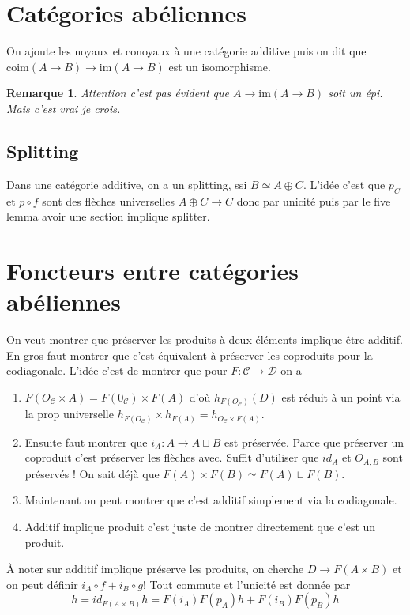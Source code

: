 \documentclass[a4paper,12pt]{book}
\newcommand{\Cat}{\mathcal{C}}
\newcommand{\Dat}{\mathcal{D}}
\newcommand{\im}{\textrm{im}}
\newcommand{\coim}{\textrm{coim}}
\theoremstyle{plain}
\newtheorem{rem}{Remarque}
\theoremstyle{definition}
\theoremstyle{remark}
\begin{document}
\section{Catégories abéliennes}
On ajoute les noyaux et conoyaux à une catégorie additive puis
on dit que $\coim(A\to B)\to \im(A\to B)$ est un isomorphisme.
\begin{rem}
  Attention c'est pas évident que $A\to \im(A\to B)$ soit un
  épi. Mais c'est vrai je crois.
\end{rem}

\subsection{Splitting}
Dans une catégorie additive, on a un splitting, ssi 
$B\simeq A\oplus C$. L'idée c'est que $p_C$ et $p\circ f$ sont
des flèches universelles $A\oplus C\to C$ donc par unicité puis
par le five lemma avoir une section implique splitter.

\section{Foncteurs entre catégories abéliennes}
On veut montrer que préserver les produits à deux éléments
implique être additif. En gros faut montrer que c'est équivalent
à préserver les coproduits pour la codiagonale. L'idée c'est
de montrer que pour $F\colon \Cat\to \Dat$ on a
\begin{enumerate}
  \item $F(O_{\Cat}\times A)=F(0_{\Cat})\times F(A)$ d'où 
    $h_{F(O_{\Cat})}(D)$ est réduit à un point via la prop
    universelle 
    $h_{F(O_{\Cat})}\times h_{F(A)}=h_{O_{\Cat}\times F(A)}$.
  \item Ensuite faut montrer que $i_A\colon A\to A\sqcup B$ est
    préservée. Parce que préserver un coproduit c'est préserver
    les flèches avec. Suffit d'utiliser que $id_A$ et $O_{A,B}$
    sont préservés ! On sait déjà que 
    $F(A)\times F(B)\simeq F(A)\sqcup F(B)$.
  \item Maintenant on peut montrer que c'est additif simplement
    via la codiagonale.
  \item Additif implique produit c'est juste de montrer directement
    que c'est un produit.
\end{enumerate}
À noter sur additif implique préserve les produits, on cherche
$D\to F(A\times B)$ et on peut définir $i_A\circ f + i_B\circ g$!
Tout commute et l'unicité est donnée par 
\[h=id_{F(A\times B)}h=F(i_A)F(p_A)h+F(i_B)F(p_B)h\]
\end{document}
